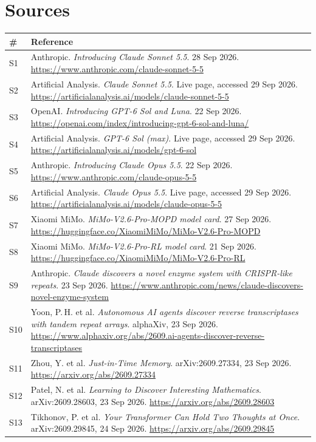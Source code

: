 \documentclass[11pt,a4paper]{article}
\begin{document}
\section{Sources}
{\footnotesize
\begin{tabularx}{\textwidth}{@{}l X@{}}
\toprule
\textbf{\#} & \textbf{Reference} \\
\midrule
S1 & Anthropic. \emph{Introducing Claude Sonnet 5.5}. 28 Sep 2026. \url{https://www.anthropic.com/claude-sonnet-5-5} \\
S2 & Artificial Analysis. \emph{Claude Sonnet 5.5}. Live page, accessed 29 Sep 2026. \url{https://artificialanalysis.ai/models/claude-sonnet-5-5} \\
S3 & OpenAI. \emph{Introducing GPT-6 Sol and Luna}. 22 Sep 2026. \url{https://openai.com/index/introducing-gpt-6-sol-and-luna/} \\
S4 & Artificial Analysis. \emph{GPT-6 Sol (max)}. Live page, accessed 29 Sep 2026. \url{https://artificialanalysis.ai/models/gpt-6-sol} \\
S5 & Anthropic. \emph{Introducing Claude Opus 5.5}. 22 Sep 2026. \url{https://www.anthropic.com/claude-opus-5-5} \\
S6 & Artificial Analysis. \emph{Claude Opus 5.5}. Live page, accessed 29 Sep 2026. \url{https://artificialanalysis.ai/models/claude-opus-5-5} \\
S7 & Xiaomi MiMo. \emph{MiMo-V2.6-Pro-MOPD model card}. 27 Sep 2026. \url{https://huggingface.co/XiaomiMiMo/MiMo-V2.6-Pro-MOPD} \\
S8 & Xiaomi MiMo. \emph{MiMo-V2.6-Pro-RL model card}. 21 Sep 2026. \url{https://huggingface.co/XiaomiMiMo/MiMo-V2.6-Pro-RL} \\
S9 & Anthropic. \emph{Claude discovers a novel enzyme system with CRISPR-like repeats}. 23 Sep 2026. \url{https://www.anthropic.com/news/claude-discovers-novel-enzyme-system} \\
S10 & Yoon, P.\,H. et al. \emph{Autonomous AI agents discover reverse transcriptases with tandem repeat arrays}. alphaXiv, 23 Sep 2026. \url{https://www.alphaxiv.org/abs/2609.ai-agents-discover-reverse-transcriptases} \\
S11 & Zhou, Y. et al. \emph{Just-in-Time Memory}. arXiv:2609.27334, 23 Sep 2026. \url{https://arxiv.org/abs/2609.27334} \\
S12 & Patel, N. et al. \emph{Learning to Discover Interesting Mathematics}. arXiv:2609.28603, 23 Sep 2026. \url{https://arxiv.org/abs/2609.28603} \\
S13 & Tikhonov, P. et al. \emph{Your Transformer Can Hold Two Thoughts at Once}. arXiv:2609.29845, 24 Sep 2026. \url{https://arxiv.org/abs/2609.29845} \\

\end{tabularx}}
\end{document}
